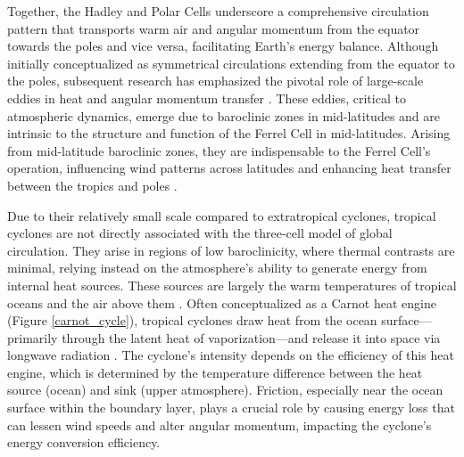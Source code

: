 Together, the Hadley and Polar Cells underscore a comprehensive circulation pattern that transports warm air and angular momentum from the equator towards the poles and vice versa, facilitating Earth's energy balance. Although initially conceptualized as symmetrical circulations extending from the equator to the poles, subsequent research has emphasized the pivotal role of large-scale eddies in heat and angular momentum transfer \citep{schneider2006general}. These eddies, critical to atmospheric dynamics, emerge due to baroclinic zones in mid-latitudes and are intrinsic to the structure and function of the Ferrel Cell in mid-latitudes\citep{held1999macroturbulence,schneider2006general}. Arising from mid-latitude baroclinic zones, they are indispensable to the Ferrel Cell's operation, influencing wind patterns across latitudes and enhancing heat transfer between the tropics and poles \citep{stull2015practical, held1999macroturbulence}.

Due to their relatively small scale compared to extratropical cyclones, tropical cyclones are not directly associated with the three-cell model of global circulation. They arise in regions of low baroclinicity, where thermal contrasts are minimal, relying instead on the atmosphere's ability to generate energy from internal heat sources. These sources are largely the warm temperatures of tropical oceans and the air above them \citep{palmen1969atmospheric}. Often conceptualized as a Carnot heat engine (Figure \ref{carnot_cycle}), tropical cyclones draw heat from the ocean surface—primarily through the latent heat of vaporization—and release it into space via longwave radiation \citep[e.g.,]{emanuel1987dependence,ozawa2015thermodynamics,wang2022tropical}. The cyclone's intensity depends on the efficiency of this heat engine, which is determined by the temperature difference between the heat source (ocean) and sink (upper atmosphere). Friction, especially near the ocean surface within the boundary layer, plays a crucial role by causing energy loss that can lessen wind speeds and alter angular momentum, impacting the cyclone's energy conversion efficiency.

